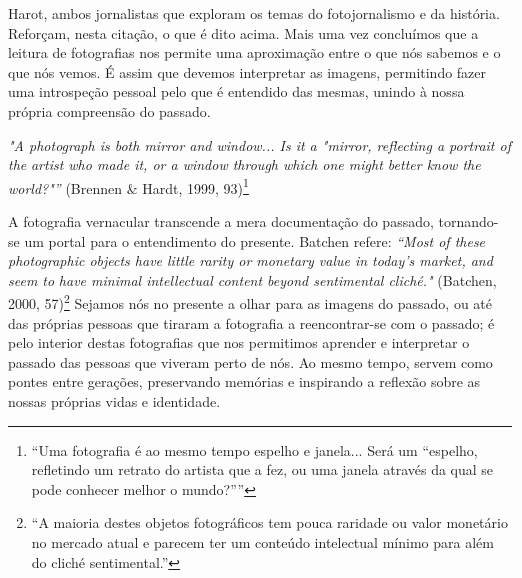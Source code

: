 \documentclass{article}
\begin{document}
 



Harot,  ambos  jornalistas  que  exploram  os  temas  do  fotojornalismo  e  da  história. 
Reforçam, nesta citação, o que é dito acima. Mais uma vez concluímos que a leitura de 
fotografias nos permite uma aproximação entre o que nós sabemos e o que nós vemos. É 
assim que devemos interpretar as imagens, permitindo fazer uma introspeção pessoal pelo 
que é entendido das mesmas, unindo à nossa própria compreensão do passado.  
 
\textit{"A photograph is both mirror and window... Is it a "mirror, reflecting a portrait of the }
\textit{artist who made it, or a window through which one might better know the world?"”} 
(Brennen \& Hardt, 1999, 93)\footnote{“Uma fotografia é ao mesmo tempo espelho e janela... Será um “espelho, refletindo um retrato do artista que a fez, ou uma janela através da qual se pode conhecer melhor o mundo?”” } 
 
A fotografia vernacular transcende a mera documentação do passado, tornando-
se  um  portal  para  o  entendimento  do  presente.  Batchen  refere:  \textit{“Most  of  these }
\textit{photographic objects have little rarity or monetary value in today’s market, and seem to }
\textit{have  minimal  intellectual  content  beyond  sentimental  cliché."}  (Batchen,  2000,  57)\footnote{“A maioria destes objetos fotográficos tem pouca raridade ou valor monetário no mercado atual e parecem ter um conteúdo intelectual mínimo para além do cliché sentimental.” } 
Sejamos nós no presente a olhar para as imagens do passado, ou até das próprias pessoas 
que tiraram a fotografia a reencontrar-se com o passado; é pelo interior destas fotografias 
que nos permitimos aprender e interpretar o passado das pessoas que viveram perto de 
nós.  Ao  mesmo  tempo,  servem  como  pontes  entre  gerações,  preservando  memórias  e 
inspirando a reflexão sobre as nossas próprias vidas e identidade.  











 


 
\end{document}
